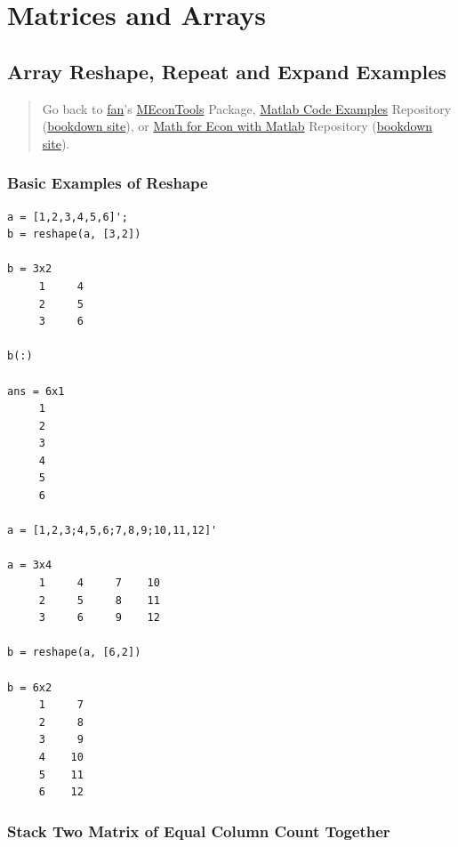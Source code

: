 \documentclass[
]{book}
\begin{document}
\hypertarget{matrices-and-arrays}{%
\section{Matrices and Arrays}\label{matrices-and-arrays}}

\hypertarget{array-reshape-repeat-and-expand-examples}{%
\subsection{Array Reshape, Repeat and Expand Examples}\label{array-reshape-repeat-and-expand-examples}}

\begin{quote}
Go back to \href{http://fanwangecon.github.io/}{fan}'s \href{https://fanwangecon.github.io/MEconTools/}{MEconTools} Package, \href{https://fanwangecon.github.io/M4Econ/}{Matlab Code Examples} Repository (\href{https://fanwangecon.github.io/M4Econ/bookdown}{bookdown site}), or \href{https://fanwangecon.github.io/Math4Econ/}{Math for Econ with Matlab} Repository (\href{https://fanwangecon.github.io/Math4Econ/bookdown}{bookdown site}).
\end{quote}

\hypertarget{basic-examples-of-reshape}{%
\subsubsection{Basic Examples of Reshape}\label{basic-examples-of-reshape}}

\begin{verbatim}
a = [1,2,3,4,5,6]';
b = reshape(a, [3,2])

b = 3x2    
     1     4
     2     5
     3     6

b(:)

ans = 6x1    
     1
     2
     3
     4
     5
     6

a = [1,2,3;4,5,6;7,8,9;10,11,12]'

a = 3x4    
     1     4     7    10
     2     5     8    11
     3     6     9    12

b = reshape(a, [6,2])

b = 6x2    
     1     7
     2     8
     3     9
     4    10
     5    11
     6    12
\end{verbatim}

\hypertarget{stack-two-matrix-of-equal-column-count-together}{%
\subsubsection{\texorpdfstring{\textbf{Stack Two Matrix of Equal Column Count Together}}{Stack Two Matrix of Equal Column Count Together}}\label{stack-two-matrix-of-equal-column-count-together}}
\end{document}
